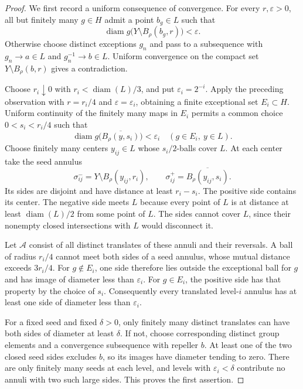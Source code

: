 \begin{proof}
We first record a uniform consequence of convergence. For every
$r,\varepsilon>0$, all but finitely many $g\in H$ admit a point
$b_g\in L$ such that
\[
  \operatorname{diam}g\bigl(Y\setminus B_\rho(b_g,r)\bigr)
  <\varepsilon.
\]
Otherwise choose distinct exceptions $g_n$ and pass to a subsequence
with $g_n\to a\in L$ and $g_n^{-1}\to b\in L$. Uniform convergence
on the compact set $Y\setminus B_\rho(b,r)$ gives a contradiction.

Choose $r_i\downarrow0$ with $r_i<\operatorname{diam}(L)/3$, and put
$\varepsilon_i=2^{-i}$. Apply the preceding observation with
$r=r_i/4$ and $\varepsilon=\varepsilon_i$, obtaining a finite
exceptional set $E_i\subset H$. Uniform continuity of the finitely
many maps in $E_i$ permits a common choice $0<s_i<r_i/4$ such that
\[
  \operatorname{diam}g\bigl(\overline{B_\rho(y,s_i)}\bigr)
  <\varepsilon_i
  \quad(g\in E_i,\ y\in L).
\]
Choose finitely many centers $y_{ij}\in L$ whose $s_i/2$-balls cover
$L$. At each center take the seed annulus
\[
  \sigma_{ij}^- =Y\setminus B_\rho(y_{ij},r_i),
  \qquad
  \sigma_{ij}^+ =\overline{B_\rho(y_{ij},s_i)}.
\]
Its sides are disjoint and have distance at least $r_i-s_i$.
The positive side contains its center. The negative side meets $L$
because every point of $L$ is at distance at least
$\operatorname{diam}(L)/2$ from some point of $L$.
The sides cannot cover $L$, since their nonempty closed intersections
with $L$ would disconnect it.

Let $\mathcal A$ consist of all distinct translates of these annuli
and their reversals. A ball of radius $r_i/4$ cannot meet both sides
of a seed annulus, whose mutual distance exceeds $3r_i/4$.
For $g\notin E_i$, one side therefore lies outside the exceptional
ball for $g$ and has image of diameter less than $\varepsilon_i$.
For $g\in E_i$, the positive side has that property by the choice of
$s_i$. Consequently every translated level-$i$ annulus has at least
one side of diameter less than $\varepsilon_i$.

For a fixed seed and fixed $\delta>0$, only finitely many distinct
translates can have both sides of diameter at least $\delta$.
If not, choose corresponding distinct group elements and a convergence
subsequence with repeller $b$. At least one of the two closed seed
sides excludes $b$, so its images have diameter tending to zero.
There are only finitely many seeds at each level, and levels with
$\varepsilon_i<\delta$ contribute no annuli with two such large sides.
This proves the first assertion.


\end{proof}
